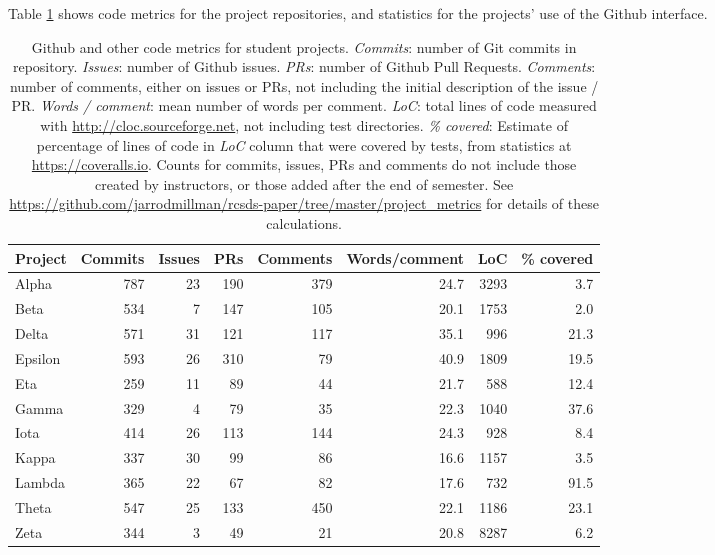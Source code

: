 Table \ref{tab:metrics} shows code metrics for the project repositories, and
statistics for the projects' use of the Github interface.

\begin{table}
\begin{tabular}{lrrrrrrr}
\hline
 Project   &   Commits &   Issues &   PRs &   Comments &   Words/comment &   LoC &   \% covered \\
\hline
 Alpha     &       787 &       23 &   190 &        379 &            24.7 &  3293 &         3.7 \\
 Beta      &       534 &        7 &   147 &        105 &            20.1 &  1753 &         2.0 \\
 Delta     &       571 &       31 &   121 &        117 &            35.1 &   996 &        21.3 \\
 Epsilon   &       593 &       26 &   310 &         79 &            40.9 &  1809 &        19.5 \\
 Eta       &       259 &       11 &    89 &         44 &            21.7 &   588 &        12.4 \\
 Gamma     &       329 &        4 &    79 &         35 &            22.3 &  1040 &        37.6 \\
 Iota      &       414 &       26 &   113 &        144 &            24.3 &   928 &         8.4 \\
 Kappa     &       337 &       30 &    99 &         86 &            16.6 &  1157 &         3.5 \\
 Lambda    &       365 &       22 &    67 &         82 &            17.6 &   732 &        91.5 \\
 Theta     &       547 &       25 &   133 &        450 &            22.1 &  1186 &        23.1 \\
 Zeta      &       344 &        3 &    49 &         21 &            20.8 &  8287 &         6.2 \\
\hline
\end{tabular}
\caption{Github and other code metrics for student projects.
    \emph{Commits}: number of Git commits in repository.
    \emph{Issues}: number of Github issues.
    \emph{PRs}: number of Github Pull Requests.
    \emph{Comments}: number of comments, either on issues or PRs, not
    including the initial description of the issue / PR.
    \emph{Words / comment}: mean number of words per comment.
    \emph{LoC}: total lines of code measured with
    \url{http://cloc.sourceforge.net}, not including test directories.
    \emph{\% covered}: Estimate of percentage of lines of code in \emph{LoC}
    column that were covered by tests, from statistics at
    \url{https://coveralls.io}.
    Counts for commits, issues, PRs and comments do not include those created
    by instructors, or those added after the end of semester. See
    \url{https://github.com/jarrodmillman/rcsds-paper/tree/master/project_metrics}
    for details of these calculations.}
\label{tab:metrics}
\end{table}

